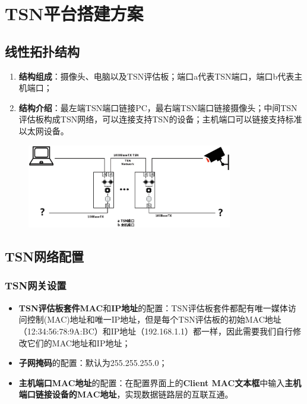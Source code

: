 \chapter{TSN平台搭建方案}

\section{线性拓扑结构}

\begin{enumerate}
	\item \textbf{结构组成}：摄像头、电脑以及TSN评估板；端口a代表TSN端口，端口b代表主机端口；
	\item \textbf{结构介绍}：最左端TSN端口链接PC，最右端TSN端口链接摄像头；中间TSN评估板构成TSN网络，可以连接支持TSN的设备；主机端口可以链接支持标准以太网设备。
\end{enumerate}

\begin{figure}[h]
    \centering
    \label{structure4}
    \includegraphics[width=0.8\textwidth]{pic/netstructure.eps}
    \setlength{\abovecaptionskip}{1pt}
\setlength{\belowcaptionskip}{1pt}
    \caption{}
\end{figure}

\section{TSN网络配置}

\subsection{TSN网关设置}

\begin{itemize}
    \item \textbf{TSN评估板套件MAC}和\textbf{IP地址}的配置：TSN评估板套件都配有唯一媒体访问控制(MAC)地址和唯一IP地址，但是每个TSN评估板的初始MAC地址（12:34:56:78:9A:BC）和IP地址（192.168.1.1）都一样，因此需要我们自行修改它们的MAC地址和IP地址；
    \item \textbf{子网掩码}的配置：默认为255.255.255.0；
    \item \textbf{主机端口MAC地址}的配置：在配置界面上的\textbf{Client MAC文本框}中输入\textbf{主机端口链接设备的MAC地址}，实现数据链路层的互联互通。
\end{itemize}

